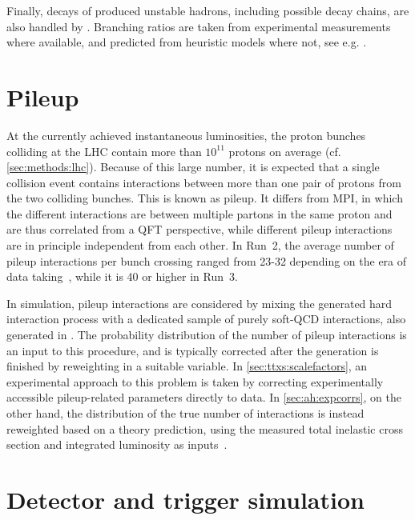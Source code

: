 Finally, decays of produced unstable hadrons, including possible decay chains, are also handled by \pythia. Branching ratios are taken from experimental measurements where available, and predicted from heuristic models where not, see e.g. .

\section{Pileup}
\label{sec:mc:pileup}

At the currently achieved instantaneous luminosities, the proton bunches colliding at the LHC contain more than $10^{11}$ protons on average (cf. \cref{sec:methods:lhc}). Because of this large number, it is expected that a single collision event contains interactions between more than one pair of protons from the two colliding bunches. This is known as pileup. It differs from MPI, in which the different interactions are between multiple partons in the same proton and are thus correlated from a QFT perspective, while different pileup interactions are in principle independent from each other. In Run~2, the average number of pileup interactions per bunch crossing ranged from 23-32 depending on the era of data taking~\cite{CMS:2020ebo}, while it is 40 or higher in Run~3.

In simulation, pileup interactions are considered by mixing the generated hard interaction process with a dedicated sample of purely soft-QCD interactions, also generated in \pythia. The probability distribution of the number of pileup interactions is an input to this procedure, and is typically corrected after the generation is finished by reweighting in a suitable variable. In \cref{sec:ttxs:scalefactors}, an experimental approach to this problem is taken by correcting experimentally accessible pileup-related parameters directly to data. In \cref{sec:ah:expcorrs}, on the other hand, the distribution of the true number of interactions is instead reweighted based on a theory prediction, using the measured total inelastic cross section and integrated luminosity as inputs~\cite{CMS:LUM-17-003}.

\section{Detector and trigger simulation}
\label{sec:mc:detector}

